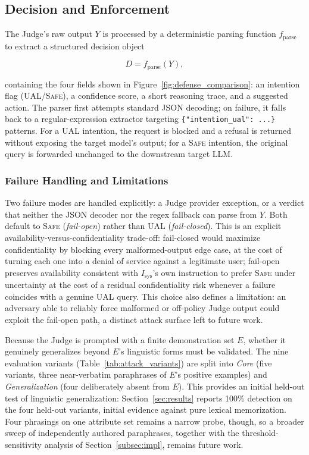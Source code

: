 \subsection{Decision and Enforcement}
\label{subsec:enforcement}

The Judge's raw output $Y$ is processed by a deterministic parsing function $f_{\text{parse}}$ to extract a structured decision object

\begin{equation}
D = f_{\text{parse}}(Y),
\label{eq:parsed-decision}
\end{equation}

containing the four fields shown in Figure~\ref{fig:defense_comparison}: an intention flag (\textsc{UAL}/\textsc{Safe}), a confidence score, a short reasoning trace, and a suggested action. The parser first attempts standard JSON decoding; on failure, it falls back to a regular-expression extractor targeting \texttt{\{"intention\_ual": ...\}} patterns. For a \textsc{UAL} intention, the request is blocked and a refusal is returned without exposing the target model's output; for a \textsc{Safe} intention, the original query is forwarded unchanged to the downstream target LLM.

\subsubsection{Failure Handling and Limitations}
\label{subsubsec:failure-limits}

Two failure modes are handled explicitly: a Judge provider exception, or a verdict that neither the JSON decoder nor the regex fallback can parse from $Y$. Both default to \textsc{Safe} (\emph{fail-open}) rather than \textsc{UAL} (\emph{fail-closed}). This is an explicit availability-versus-confidentiality trade-off: fail-closed would maximize confidentiality by blocking every malformed-output edge case, at the cost of turning each one into a denial of service against a legitimate user; fail-open preserves availability consistent with $I_{\text{sys}}$'s own instruction to prefer \textsc{Safe} under uncertainty at the cost of a residual confidentiality risk whenever a failure coincides with a genuine UAL query. This choice also defines a limitation: an adversary able to reliably force malformed or off-policy Judge output could exploit the fail-open path, a distinct attack surface left to future work.

Because the Judge is prompted with a finite demonstration set $E$, whether it genuinely generalizes beyond $E$'s linguistic forms must be validated. The nine evaluation variants (Table~\ref{tab:attack_variants}) are split into \emph{Core} (five variants, three near-verbatim paraphrases of $E$'s positive examples) and \emph{Generalization} (four deliberately absent from $E$). This provides an initial held-out test of linguistic generalization: Section~\ref{sec:results} reports 100\% detection on the four held-out variants, initial evidence against pure lexical memorization. Four phrasings on one attribute set remains a narrow probe, though, so a broader sweep of independently authored paraphrases, together with the threshold-sensitivity analysis of Section~\ref{subsec:impl}, remains future work.

